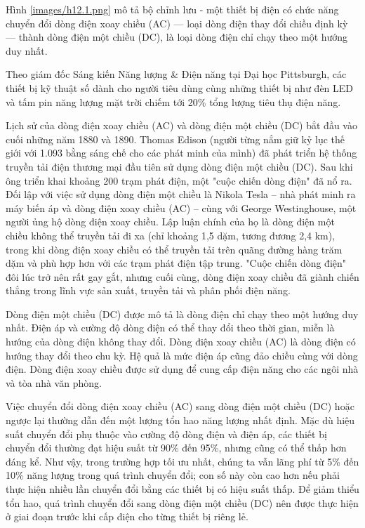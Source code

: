 \documentclass{thesis}
\begin{document}
Hình \ref{images/h12.1.png} mô tả bộ chỉnh lưu - một thiết bị điện có
chức năng chuyển đổi dòng điện xoay chiều (AC) — loại dòng điện thay
đổi chiều định kỳ — thành dòng điện một chiều (DC), là loại dòng điện
chỉ chạy theo một hướng duy nhất.

Theo giám đốc Sáng kiến Năng lượng \& Điện năng tại Đại học
Pittsburgh, các thiết bị kỹ thuật số dành cho người tiêu dùng cùng
những thiết bị như đèn LED và tấm pin năng lượng mặt trời chiếm tới
20\% tổng lượng tiêu thụ điện năng.

Lịch sử của dòng điện xoay chiều (AC) và dòng điện một chiều (DC) bắt
đầu vào cuối những năm 1880 và 1890. Thomas Edison (người từng nắm
  giữ kỷ lục thế giới với 1.093 bằng sáng chế cho các phát minh của
mình) đã phát triển hệ thống truyền tải điện thương mại đầu tiên sử
dụng dòng điện một chiều (DC). Sau khi ông triển khai khoảng 200 trạm
phát điện, một "cuộc chiến dòng điện" đã nổ ra. Đối lập với việc sử
dụng dòng điện một chiều là Nikola Tesla – nhà phát minh ra máy biến
áp và dòng điện xoay chiều (AC) – cùng với George Westinghouse, một
người ủng hộ dòng điện xoay chiều. Lập luận chính của họ là dòng điện
một chiều không thể truyền tải đi xa (chỉ khoảng 1,5 dặm, tương đương
2,4 km), trong khi dòng điện xoay chiều có thể truyền tải trên quãng
đường hàng trăm dặm và phù hợp hơn với các trạm phát điện tập trung.
"Cuộc chiến dòng điện" đôi lúc trở nên rất gay gắt, nhưng cuối cùng,
dòng điện xoay chiều đã giành chiến thắng trong lĩnh vực sản xuất,
truyền tải và phân phối điện năng.

Dòng điện một chiều (DC) được mô tả là dòng điện chỉ chạy theo một
hướng duy nhất. Điện áp và cường độ dòng điện có thể thay đổi theo
thời gian, miễn là hướng của dòng điện không thay đổi. Dòng điện xoay
chiều (AC) là dòng điện có hướng thay đổi theo chu kỳ. Hệ quả là mức
điện áp cũng đảo chiều cùng với dòng điện. Dòng điện xoay chiều được
sử dụng để cung cấp điện năng cho các ngôi nhà và tòa nhà văn phòng.

Việc chuyển đổi dòng điện xoay chiều (AC) sang dòng điện một chiều
(DC) hoặc ngược lại thường dẫn đến một lượng tổn hao năng lượng nhất
định. Mặc dù hiệu suất chuyển đổi phụ thuộc vào cường độ dòng điện và
điện áp, các thiết bị chuyển đổi thường đạt hiệu suất từ 90\% đến
95\%, nhưng cũng có thể thấp hơn đáng kể. Như vậy, trong trường hợp
tối ưu nhất, chúng ta vẫn lãng phí từ 5\% đến 10\% năng lượng trong
quá trình chuyển đổi; con số này còn cao hơn nếu phải thực hiện nhiều
lần chuyển đổi bằng các thiết bị có hiệu suất thấp. Để giảm thiểu tổn
hao, quá trình chuyển đổi sang dòng điện một chiều (DC) nên được thực
hiện ở giai đoạn trước khi cấp điện cho từng thiết bị riêng lẻ.
\end{document}
